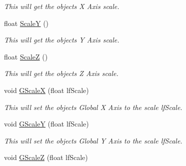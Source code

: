 \begin{DoxyCompactItemize}
\begin{DoxyCompactList}\small\item\em This will get the objects X Axis scale. \end{DoxyCompactList}\item 
\hypertarget{classc_matrix4_abe36828ea2ddcee19612d4f136c49287}{
float \hyperlink{classc_matrix4_abe36828ea2ddcee19612d4f136c49287}{ScaleY} ()}
\label{classc_matrix4_abe36828ea2ddcee19612d4f136c49287}

\begin{DoxyCompactList}\small\item\em This will get the objects Y Axis scale. \end{DoxyCompactList}\item 
\hypertarget{classc_matrix4_a42eda4ea2a974f5b13591f083e45d14c}{
float \hyperlink{classc_matrix4_a42eda4ea2a974f5b13591f083e45d14c}{ScaleZ} ()}
\label{classc_matrix4_a42eda4ea2a974f5b13591f083e45d14c}

\begin{DoxyCompactList}\small\item\em This will get the objects Z Axis scale. \end{DoxyCompactList}\item 
\hypertarget{classc_matrix4_ac69f9e4ee1118580de8972e2b66da868}{
void \hyperlink{classc_matrix4_ac69f9e4ee1118580de8972e2b66da868}{GScaleX} (float lfScale)}
\label{classc_matrix4_ac69f9e4ee1118580de8972e2b66da868}

\begin{DoxyCompactList}\small\item\em This will set the objects Global X Axis to the scale lfScale. \end{DoxyCompactList}\item 
\hypertarget{classc_matrix4_af1cf539a6f87767feb23251fad0289c8}{
void \hyperlink{classc_matrix4_af1cf539a6f87767feb23251fad0289c8}{GScaleY} (float lfScale)}
\label{classc_matrix4_af1cf539a6f87767feb23251fad0289c8}

\begin{DoxyCompactList}\small\item\em This will set the objects Global Y Axis to the scale lfScale. \end{DoxyCompactList}\item 
\hypertarget{classc_matrix4_aa8cf98447437599b613eb491f510ee7d}{
void \hyperlink{classc_matrix4_aa8cf98447437599b613eb491f510ee7d}{GScaleZ} (float lfScale)}
\label{classc_matrix4_aa8cf98447437599b613eb491f510ee7d}


\end{DoxyCompactItemize}
